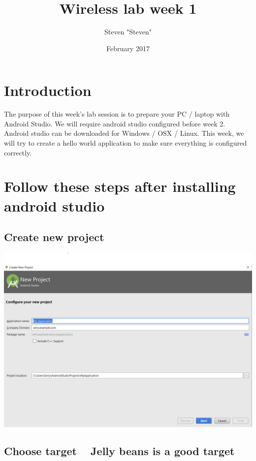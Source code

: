 \documentclass{article}
\title{Wireless lab week 1}
\author{Steven "Steven"}
\date{February 2017}
\begin{document}
\maketitle


\section{Introduction}

The purpose of this week's lab session is to prepare your PC / laptop with Android Studio. We will require android studio configured before week 2. Android studio can be downloaded for Windows / OSX / Linux. This week, we will try to create a hello world application to make sure everything is configured correctly.


\section{Follow these steps after installing android studio}

\subsection{Create new project}

\includegraphics[width=\textwidth]{lab1-1}

\subsection{Choose target ~ Jelly beans is a good target}
\end{document}
